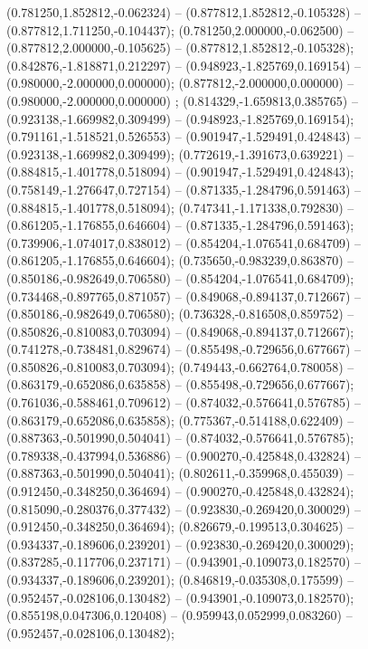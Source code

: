  (0.781250,1.852812,-0.062324) -- (0.877812,1.852812,-0.105328) -- (0.877812,1.711250,-0.104437);
 (0.781250,2.000000,-0.062500) -- (0.877812,2.000000,-0.105625) -- (0.877812,1.852812,-0.105328);
 (0.842876,-1.818871,0.212297) -- (0.948923,-1.825769,0.169154) -- (0.980000,-2.000000,0.000000);
 (0.877812,-2.000000,0.000000) -- (0.980000,-2.000000,0.000000) ;
 (0.814329,-1.659813,0.385765) -- (0.923138,-1.669982,0.309499) -- (0.948923,-1.825769,0.169154);
 (0.791161,-1.518521,0.526553) -- (0.901947,-1.529491,0.424843) -- (0.923138,-1.669982,0.309499);
 (0.772619,-1.391673,0.639221) -- (0.884815,-1.401778,0.518094) -- (0.901947,-1.529491,0.424843);
 (0.758149,-1.276647,0.727154) -- (0.871335,-1.284796,0.591463) -- (0.884815,-1.401778,0.518094);
 (0.747341,-1.171338,0.792830) -- (0.861205,-1.176855,0.646604) -- (0.871335,-1.284796,0.591463);
 (0.739906,-1.074017,0.838012) -- (0.854204,-1.076541,0.684709) -- (0.861205,-1.176855,0.646604);
 (0.735650,-0.983239,0.863870) -- (0.850186,-0.982649,0.706580) -- (0.854204,-1.076541,0.684709);
 (0.734468,-0.897765,0.871057) -- (0.849068,-0.894137,0.712667) -- (0.850186,-0.982649,0.706580);
 (0.736328,-0.816508,0.859752) -- (0.850826,-0.810083,0.703094) -- (0.849068,-0.894137,0.712667);
 (0.741278,-0.738481,0.829674) -- (0.855498,-0.729656,0.677667) -- (0.850826,-0.810083,0.703094);
 (0.749443,-0.662764,0.780058) -- (0.863179,-0.652086,0.635858) -- (0.855498,-0.729656,0.677667);
 (0.761036,-0.588461,0.709612) -- (0.874032,-0.576641,0.576785) -- (0.863179,-0.652086,0.635858);
 (0.775367,-0.514188,0.622409) -- (0.887363,-0.501990,0.504041) -- (0.874032,-0.576641,0.576785);
 (0.789338,-0.437994,0.536886) -- (0.900270,-0.425848,0.432824) -- (0.887363,-0.501990,0.504041);
 (0.802611,-0.359968,0.455039) -- (0.912450,-0.348250,0.364694) -- (0.900270,-0.425848,0.432824);
 (0.815090,-0.280376,0.377432) -- (0.923830,-0.269420,0.300029) -- (0.912450,-0.348250,0.364694);
 (0.826679,-0.199513,0.304625) -- (0.934337,-0.189606,0.239201) -- (0.923830,-0.269420,0.300029);
 (0.837285,-0.117706,0.237171) -- (0.943901,-0.109073,0.182570) -- (0.934337,-0.189606,0.239201);
 (0.846819,-0.035308,0.175599) -- (0.952457,-0.028106,0.130482) -- (0.943901,-0.109073,0.182570);
 (0.855198,0.047306,0.120408) -- (0.959943,0.052999,0.083260) -- (0.952457,-0.028106,0.130482);
